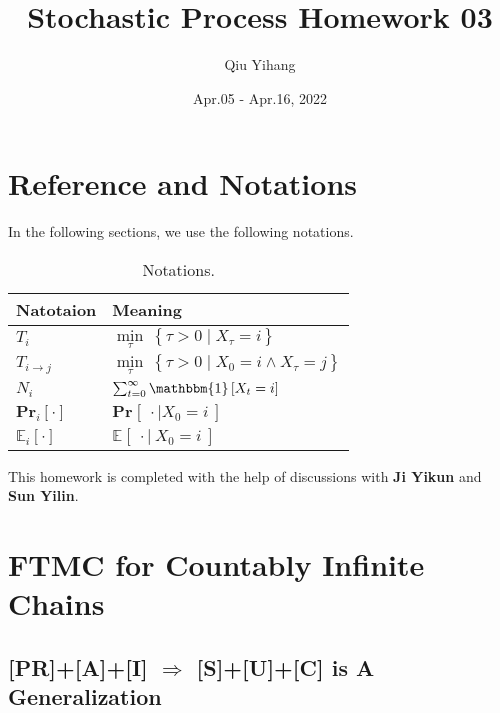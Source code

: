 \documentclass{article}
\title{\textbf{Stochastic Process Homework 03}}
\author{Qiu Yihang}
\date{Apr.05 - Apr.16, 2022}
\renewcommand{\Pr}[2]{\mathbf{Pr}_{#1}\left[#2\right]}
\newcommand{\set}[1]{\left\{#1\right\}}
\newcommand{\staExp}[2]{\mathbb{E}_{#1}\left[#2\right]}
\begin{document}
\maketitle

\setcounter{section}{-1}
\section{Reference and Notations}

\hspace{2em}
In the following sections, we use the following notations.

\vspace{-0.6em}
\begin{table}[htbp]
    \centering
    \begin{tabular}{ll}
        \hline
        Natotaion & Meaning \\
        \hline 
        $T_i$ & $\underset{\tau}{\min}\ \set{\tau>0\mid X_{\tau}=i}$ \\
        $T_{i\rightarrow j}$ & $\underset{\tau}{\min}\ \set{\tau>0\mid X_0 = i\land X_{\tau}=j}$ \\
        $N_i$ & $\sum_{t=0}^{\infty}\mathbbm{1} \left[X_t=i\right]$\\
        $\Pr{i}{\cdot}$ & $\Pr{}{\ \cdot\mid X_0=i\ }$ \\
        $\staExp{i}{\cdot}$ & $\staExp{}{\ \cdot\mid\ X_0=i\ }$ \\
        \hline
\end{tabular}
\caption{Notations.}
\end{table}

\vspace{-0.5em} \hspace{0.7em}
This homework is completed with the help of discussions with \textbf{Ji Yikun} and \textbf{Sun Yilin}.

\vspace{1em}
\section{FTMC for Countably Infinite Chains}
\vspace{1em}
\subsection{[PR]+[A]+[I] $\Rightarrow$ [S]+[U]+[C] is A Generalization}
\vspace{1em}
\end{document}
